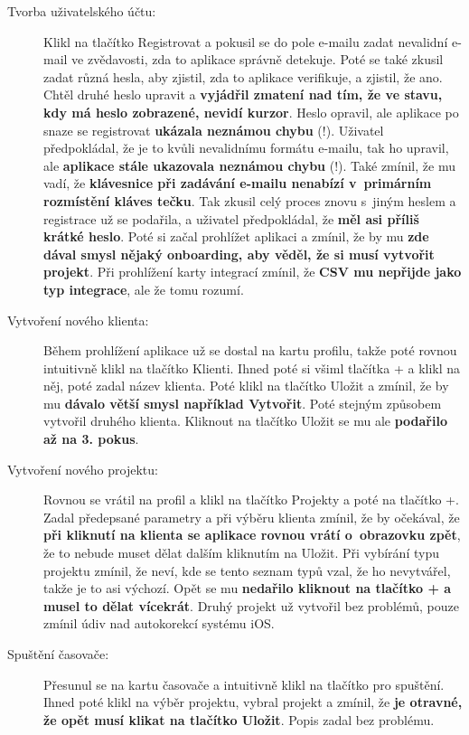 \begin{description}
\item[Tvorba uživatelského účtu:] Klikl na tlačítko Registrovat a pokusil se do pole e-mailu zadat nevalidní e-mail ve zvědavosti, zda to aplikace správně detekuje. Poté se také zkusil zadat různá hesla, aby zjistil, zda to aplikace verifikuje, a zjistil, že ano. Chtěl druhé heslo upravit a \textbf{vyjádřil zmatení nad tím, že ve stavu, kdy má heslo zobrazené, nevidí kurzor}. Heslo opravil, ale aplikace po snaze se registrovat \textbf{ukázala neznámou chybu} (!). Uživatel předpokládal, že je to kvůli nevalidnímu formátu e-mailu, tak ho upravil, ale \textbf{aplikace stále ukazovala neznámou chybu} (!). Také zmínil, že mu vadí, že \textbf{klávesnice při zadávání e-mailu nenabízí v~primárním rozmístění kláves tečku}. Tak zkusil celý proces znovu s~jiným heslem a registrace už se podařila, a uživatel předpokládal, že \textbf{měl asi příliš krátké heslo}. Poté si začal prohlížet aplikaci a zmínil, že by mu \textbf{zde dával smysl nějaký onboarding, aby věděl, že si musí vytvořit projekt}. Při prohlížení karty integrací zmínil, že \textbf{CSV mu nepřijde jako typ integrace}, ale že tomu rozumí.
\item[Vytvoření nového klienta:] Během prohlížení aplikace už se dostal na kartu profilu, takže poté rovnou intuitivně klikl na tlačítko Klienti. Ihned poté si všiml tlačítka + a klikl na něj, poté zadal název klienta. Poté klikl na tlačítko Uložit a zmínil, že by mu \textbf{dávalo větší smysl například Vytvořit}. Poté stejným způsobem vytvořil druhého klienta. Kliknout na tlačítko Uložit se mu ale \textbf{podařilo až na 3. pokus}.
\item[Vytvoření nového projektu:] Rovnou se vrátil na profil a klikl na tlačítko Projekty a poté na tlačítko +. Zadal předepsané parametry a při výběru klienta zmínil, že by očekával, že \textbf{při kliknutí na klienta se aplikace rovnou vrátí o~obrazovku zpět}, že to nebude muset dělat dalším kliknutím na Uložit. Při vybírání typu projektu zmínil, že neví, kde se tento seznam typů vzal, že ho nevytvářel, takže je to asi výchozí. Opět se mu \textbf{nedařilo kliknout na tlačítko + a musel to dělat vícekrát}. Druhý projekt už vytvořil bez problémů, pouze zmínil údiv nad autokorekcí systému iOS.
\item[Spuštění časovače:] Přesunul se na kartu časovače a intuitivně klikl na tlačítko pro spuštění. Ihned poté klikl na výběr projektu, vybral projekt a zmínil, že \textbf{je otravné, že opět musí klikat na tlačítko Uložit}. Popis zadal bez problému.

\end{description}
